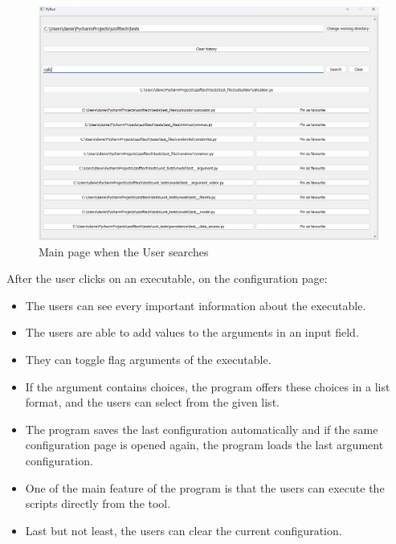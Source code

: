 \documentclass{article}
\begin{document}
\begin{figure}[h]
    \centering
    \includegraphics[width=1\linewidth]{img/search.png}
    \caption{Main page when the User searches}
    \label{fig:enter-label}
\end{figure}

\clearpage

After the user clicks on an executable, on the configuration page:
\begin{itemize}
    \item The users can see every important information about the executable.
    \item The users are able to add values to the arguments in an input field. 
    \item They can toggle flag arguments of the executable.
    \item If the argument contains choices, the program offers these choices in a list format, and the users can select from the given list.
    \item The program saves the last configuration automatically and if the same configuration page is opened again, the program loads the last argument configuration.
    \item One of the main feature of the program is that the users can execute the scripts directly from the tool.
    \item Last but not least, the users can clear the current configuration.
\end{itemize}
\end{document}
